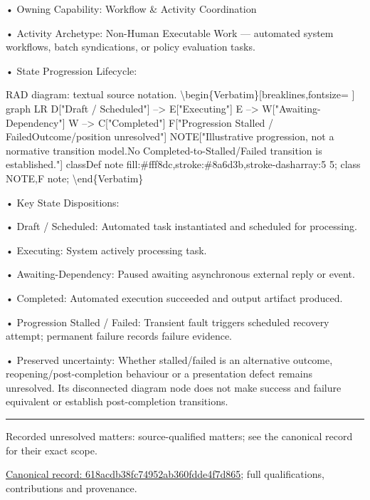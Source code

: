 •
Owning Capability: Workflow \& Activity Coordination



•
Activity Archetype: Non-Human Executable Work — automated system workflows, batch syndications, or policy evaluation tasks.



•
State Progression Lifecycle:



RAD diagram: textual source notation.
\textbackslash{}begin\{Verbatim\}[breaklines,fontsize=
]
graph LR
    D["Draft / Scheduled"] --> E["Executing"]
    E --> W["Awaiting-Dependency"]
    W --> C["Completed"]
    F["Progression Stalled / Failed\newline{}Outcome/position unresolved"]
    NOTE["Illustrative progression, not a normative transition model.\newline{}No Completed-to-Stalled/Failed transition is established."]
    classDef note fill:\#fff8dc,stroke:\#8a6d3b,stroke-dasharray:5 5;
    class NOTE,F note;
\textbackslash{}end\{Verbatim\}



•
Key State Dispositions:



•
Draft / Scheduled: Automated task instantiated and scheduled for processing.



•
Executing: System actively processing task.



•
Awaiting-Dependency: Paused awaiting asynchronous external reply or event.



•
Completed: Automated execution succeeded and output artifact produced.



•
Progression Stalled / Failed: Transient fault triggers scheduled recovery attempt; permanent failure records failure evidence.



•
Preserved uncertainty: Whether stalled/failed is an alternative outcome, reopening/post-completion behaviour or a presentation defect remains unresolved. Its disconnected diagram node does not make success and failure equivalent or establish post-completion transitions.



\medskip\hrule\medskip

{\small Recorded unresolved matters: source-qualified matters; see the canonical record for their exact scope.}\par
{\footnotesize \href{../../../../continuum/business/business-process/618acdb38fc74952ab360fdde4f7d865.md}{Canonical record: 618acdb38fc74952ab360fdde4f7d865}; full qualifications, contributions and provenance.}\par
